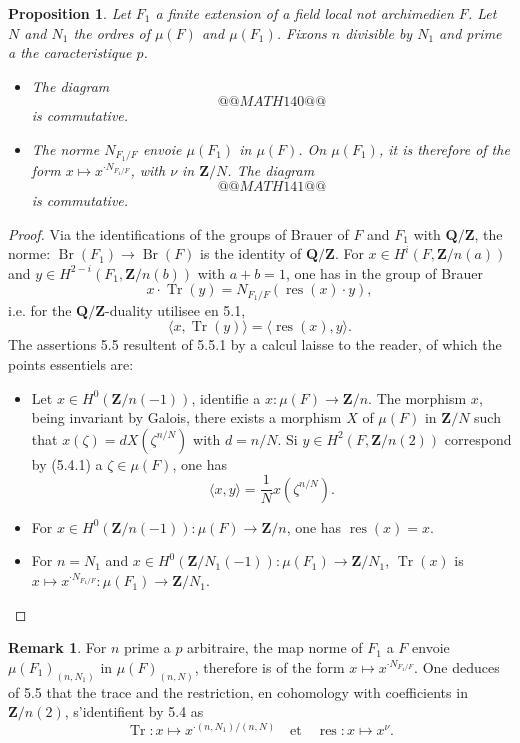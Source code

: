 \documentclass[11pt,a4paper]{article}
\theoremstyle{plain}
\newtheorem{proposition}[theorem]{Proposition}
\theoremstyle{definition}
\newtheorem{remark}[theorem]{Remark}
\DeclareMathOperator{\Br}{Br}
\DeclareMathOperator{\res}{res}
\DeclareMathOperator{\Tr}{Tr}
\begin{document}
\begin{proposition}\label{5.5}
Let $F_1$ a finite extension of a field local not archimedien $F$. Let $N$ and $N_1$ the ordres of $\mu(F)$ and $\mu(F_1)$. Fixons $n$ divisible by $N_1$ and prime a the caracteristique $p$.
\begin{itemize}
\item[(i)] The diagram
\[
@@MATH140@@
\]
is commutative.
\item[(ii)] The norme $N_{F_1/F}$ envoie $\mu(F_1)$ in $\mu(F)$. On $\mu(F_1)$, it is therefore of the form $x \mapsto x^{\cdot N_{F_1/F}}$, with $\nu$ in $\mathbf{Z}/N$. The diagram
\[
@@MATH141@@
\]
is commutative.
\end{itemize}
\end{proposition}

\begin{proof}
Via the identifications of the groups of Brauer of $F$ and $F_1$ with $\mathbf{Q}/\mathbf{Z}$, the norme: $\Br(F_1) \to \Br(F)$ is the identity of $\mathbf{Q}/\mathbf{Z}$. For $x \in H^i(F, \mathbf{Z}/n(a))$ and $y \in H^{2-i}(F_1, \mathbf{Z}/n(b))$ with $a + b = 1$, one has in the group of Brauer
\[
x \cdot \Tr(y) = N_{F_1/F}(\res(x) \cdot y),
\]
i.e. for the $\mathbf{Q}/\mathbf{Z}$-duality utilisee en 5.1,
\begin{equation}\label{5.5.1}
\langle x, \Tr(y) \rangle = \langle \res(x), y \rangle.
\end{equation}
The assertions 5.5 resultent of 5.5.1 by a calcul laisse to the reader, of which the points essentiels are:
\begin{itemize}
\item[a)] Let $x \in H^0(\mathbf{Z}/n(-1))$, identifie a $x : \mu(F) \to \mathbf{Z}/n$. The morphism $x$, being invariant by Galois, there exists a morphism $X$ of $\mu(F)$ in $\mathbf{Z}/N$ such that $x(\zeta) = d X(\zeta^{n/N})$ with $d = n/N$. Si $y \in H^2(F, \mathbf{Z}/n(2))$ correspond by (5.4.1) a $\zeta \in \mu(F)$, one has
\[
\langle x, y \rangle = \frac{1}{N} x(\zeta^{n/N}).
\]
\item[b)] For $x \in H^0(\mathbf{Z}/n(-1)) : \mu(F) \to \mathbf{Z}/n$, one has $\res(x) = x$.
\item[c)] For $n = N_1$ and $x \in H^0(\mathbf{Z}/N_1(-1)) : \mu(F_1) \to \mathbf{Z}/N_1$, $\Tr(x)$ is $x \mapsto x^{\cdot N_{F_1/F}} : \mu(F_1) \to \mathbf{Z}/N_1$. \qedhere
\end{itemize}
\end{proof}

\begin{remark}\label{5.6}
For $n$ prime a $p$ arbitraire, the map norme of $F_1$ a $F$ envoie $\mu(F_1)_{(n,N_1)}$ in $\mu(F)_{(n,N)}$, therefore is of the form $x \mapsto x^{\cdot N_{F_1/F}}$. One deduces of 5.5 that the trace and the restriction, en cohomology with coefficients in $\mathbf{Z}/n(2)$, s'identifient by 5.4 as
\[
\Tr : x \mapsto x^{\cdot (n,N_1)/(n,N)} \quad \text{et} \quad \res : x \mapsto x^{\nu}.
\]
\end{remark}
\end{document}
